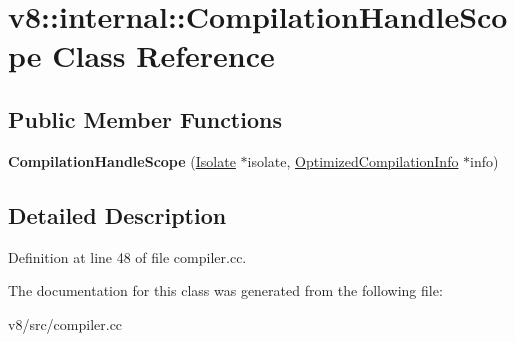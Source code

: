 \hypertarget{classv8_1_1internal_1_1CompilationHandleScope}{}\section{v8\+:\+:internal\+:\+:Compilation\+Handle\+Scope Class Reference}
\label{classv8_1_1internal_1_1CompilationHandleScope}
\subsection*{Public Member Functions}
\begin{DoxyCompactItemize}
\item 
\mbox{\label{classv8_1_1internal_1_1CompilationHandleScope_a074160965e31dd5b9a31c77cd3ff4a87}} 
{\bfseries Compilation\+Handle\+Scope} (\mbox{\hyperlink{classv8_1_1internal_1_1Isolate}{Isolate}} $\ast$isolate, \mbox{\hyperlink{classv8_1_1internal_1_1OptimizedCompilationInfo}{Optimized\+Compilation\+Info}} $\ast$info)
\end{DoxyCompactItemize}


\subsection{Detailed Description}


Definition at line 48 of file compiler.\+cc.



The documentation for this class was generated from the following file\+:\begin{DoxyCompactItemize}
\item 
v8/src/compiler.\+cc\end{DoxyCompactItemize}
